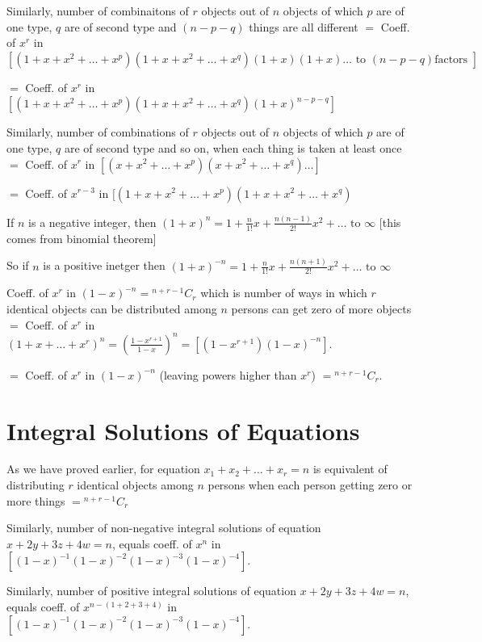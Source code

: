 Similarly, number of combinaitons of $r$ objects out of $n$ objects of which $p$ are of one type, $q$ are of second type and $(n -
p - q)$ things are all different $=$ Coeff. of $x^r$ in $[(1 + x + x^2 + \ldots + x^p)(1 + x + x^2 + \ldots + x^q)(1 + x)(1 +
  x)\ldots \text{~to~} (n - p - q)\text{factors~}]$

$=$ Coeff. of $x^r$ in $[(1 + x + x^2 + \ldots + x^p)(1 + x + x^2 + \ldots + x^q)(1 + x)^{n - p - q}]$

Similarly, number of combinations of $r$ objects out of $n$ objects of which $p$ are of one type, $q$ are of second type and so on,
when each thing is taken at least once $=$ Coeff. of $x^r$ in $[(x + x^2 + \ldots + x^p)(x + x^2 + \ldots + x^q)\ldots]$

$=$ Coeff. of $x^{r - 3}$ in $[(1 + x + x^2 + \ldots + x^p)(1 + x + x^2 + \ldots + x^q)$

If $n$ is a negative integer, then $(1 + x)^n = 1 + \frac{n}{1!}x + \frac{n(n - 1)}{2!}x^2 + \ldots\text{~to~}\infty$ [this comes
  from binomial theorem]

So if $n$ is a positive inetger then $(1 + x)^{-n} = 1 + \frac{n}{1!}x + \frac{n(n + 1)}{2!}x^2 + \ldots\text{~to~}\infty$

Coeff. of $x^r$ in $(1 - x)^{-n} = {}^{n + r - 1}C_r$ which is number of ways in which $r$ identical objects can be distributed
among $n$ persons can get zero of more objects $=$ Coeff. of $x^r$ in $(1 + x + \ldots + x^r)^n = \left(\frac{1 - x^{r + 1}}{1 -
    x}\right)^n = [(1 - x^{r + 1})(1 - x)^{-n}]$.

$=$ Coeff. of $x^r$ in $(1 - x)^{-n}$ (leaving powers higher than $x^r$) $= {}^{n + r - 1}C_r$.

\section{Integral Solutions of Equations}
As we have proved earlier, for equation $x_1 + x_2 + \ldots + x_r = n$ is equivalent of distributing $r$ identical objects among
$n$ persons when each person getting zero or more things $= {}^{n + r - 1}C_r$

Similarly, number of non-negative integral solutions of equation $x + 2y + 3z + 4w = n$, equals coeff. of $x^n$ in $[(1 - x)^{-1}(1
  - x)^{-2}(1 - x)^{-3}(1 - x)^{-4}]$.

Similarly, number of positive integral solutions of equation $x + 2y + 3z + 4w = n$, equals coeff. of $x^{n -(1 + 2 + 3 + 4)}$ in
$[(1 - x)^{-1}(1 - x)^{-2}(1 - x)^{-3}(1 - x)^{-4}]$.

